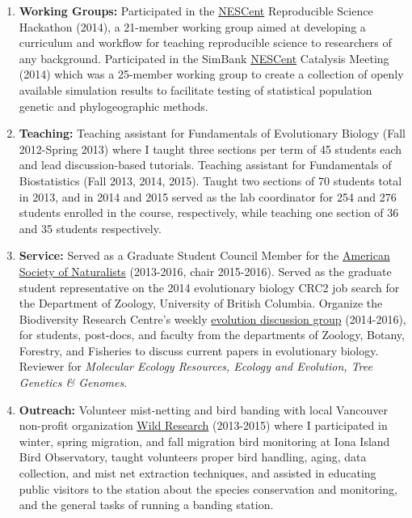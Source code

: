 \begin{enumerate}[itemsep=-0.25ex]
\item \textbf{Working Groups:} Participated in the \href{http://www.nescent.org/}{NESCent} Reproducible Science Hackathon (2014), a 21-member working group aimed at developing a curriculum and workflow for teaching reproducible science to researchers of any background. Participated in the SimBank \href{http://www.nescent.org/}{NESCent} Catalysis Meeting (2014) which was a 25-member working group to create a collection of openly available simulation results to facilitate testing of statistical population genetic and phylogeographic methods.

\item \textbf{Teaching:} Teaching assistant for Fundamentals of Evolutionary Biology (Fall 2012-Spring 2013) where I taught three sections per term of 45 students each and lead discussion-based tutorials. Teaching assistant for Fundamentals of Biostatistics (Fall 2013, 2014, 2015). Taught two sections of 70 students total in 2013, and in 2014 and 2015 served as the lab coordinator for 254 and 276 students enrolled in the course, respectively, while teaching one section of 36 and 35 students respectively.

\item \textbf{Service:} Served as a Graduate Student Council Member for the \href {http://www.amnat.org/home.html}{American Society of Naturalists} (2013-2016, chair 2015-2016). Served as the graduate student representative on the 2014 evolutionary biology CRC2 job search for the Department of Zoology, University of British Columbia. Organize the Biodiversity Research Centre's weekly \href{http://www.biodiversity.ubc.ca/edg/}{evolution discussion group} (2014-2016), for students, post-docs, and faculty  from the departments of Zoology, Botany, Forestry, and Fisheries to discuss current papers in evolutionary biology. Reviewer for \emph{Molecular Ecology Resources, Ecology and Evolution, Tree Genetics \& Genomes}.

\item \textbf{Outreach:}  Volunteer mist-netting and bird banding with local Vancouver non-profit organization \href {http://www.wildresearch.ca/IonaIsland.html}{Wild Research} (2013-2015) where I participated in winter, spring migration, and fall migration bird monitoring at Iona Island Bird Observatory, taught volunteers proper bird handling, aging, data collection, and mist net extraction techniques, and assisted in educating public visitors to the station about the species conservation and monitoring, and the general tasks of running a banding station.

\end{enumerate}

